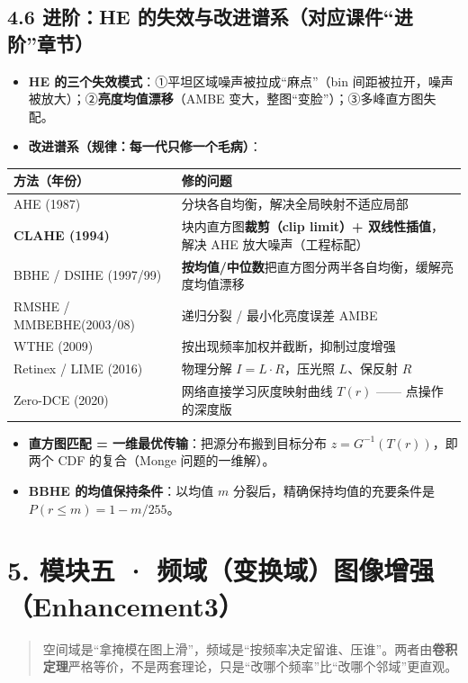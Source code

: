 \subsection*{4.6 进阶：HE 的失效与改进谱系（对应课件“进阶”章节）}
\begin{itemize}
\item \textbf{HE 的三个失效模式}：①平坦区域噪声被拉成“麻点”（bin 间距被拉开，噪声被放大）；②\textbf{亮度均值漂移}（AMBE 变大，整图“变脸”）；③多峰直方图失配。
\item \textbf{改进谱系（规律：每一代只修一个毛病）}：
\end{itemize}
\begin{center}\small\renewcommand{\arraystretch}{1.25}
\begin{tabularx}{\linewidth}{|>{\centering\arraybackslash}p{.25\linewidth}|X|}\hline
\textbf{方法（年份）}&\centering\arraybackslash\textbf{修的问题}\\\hline
AHE (1987)&分块各自均衡，解决全局映射不适应局部\\\hline
\textbf{CLAHE (1994)}&块内直方图\textbf{裁剪（clip limit）+ 双线性插值}，解决 AHE 放大噪声（工程标配）\\\hline
BBHE / DSIHE (1997/99)&\textbf{按均值/中位数}把直方图分两半各自均衡，缓解亮度均值漂移\\\hline
RMSHE / MMBEBHE\newline (2003/08)&递归分裂 / 最小化亮度误差 AMBE\\\hline
WTHE (2009)&按出现频率加权并截断，抑制过度增强\\\hline
Retinex / LIME (2016)&物理分解 $I=L\cdot R$，压光照 $L$、保反射 $R$\\\hline
Zero-DCE (2020)&网络直接学习灰度映射曲线 $T(r)$ —— 点操作的深度版\\\hline
\end{tabularx}\end{center}
\begin{itemize}
\item \textbf{直方图匹配 = 一维最优传输}：把源分布搬到目标分布 $z=G^{-1}(T(r))$，即两个 CDF 的复合（Monge 问题的一维解）。
\item \textbf{BBHE 的均值保持条件}：以均值 $m$ 分裂后，精确保持均值的充要条件是 $P(r\leq m)=1-m/255$。
\end{itemize}
\section*{5. 模块五 · 频域（变换域）图像增强（Enhancement3）}
\begin{quote}空间域是“拿掩模在图上滑”，频域是“按频率决定留谁、压谁”。两者由\textbf{卷积定理}严格等价，不是两套理论，只是“改哪个频率”比“改哪个邻域”更直观。\end{quote}
